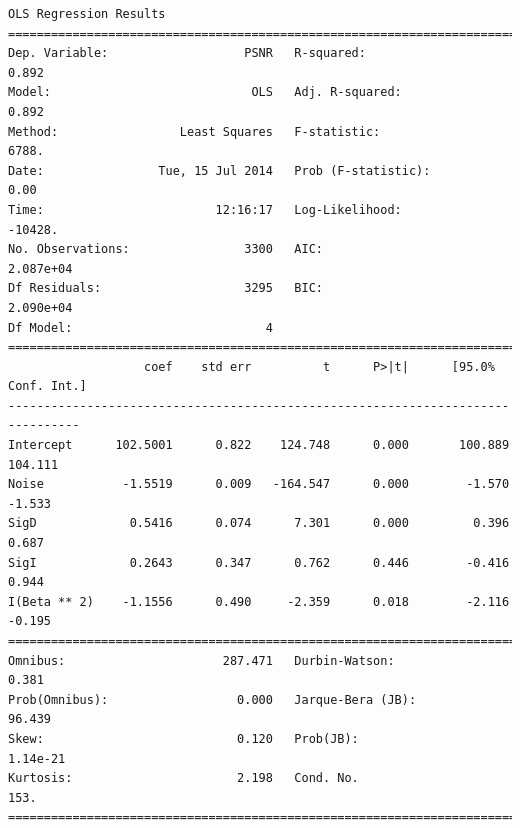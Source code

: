 \documentclass[11pt]{article}
\theoremstyle{definition}
\begin{document}
{\footnotesize
\begin{lstlisting}[caption = Time Series 1 - Bilateral Non-Local Means Filter OLS Model, label = {bilateralnlmeans1}]
                            OLS Regression Results                            
==============================================================================
Dep. Variable:                   PSNR   R-squared:                       0.892
Model:                            OLS   Adj. R-squared:                  0.892
Method:                 Least Squares   F-statistic:                     6788.
Date:                Tue, 15 Jul 2014   Prob (F-statistic):               0.00
Time:                        12:16:17   Log-Likelihood:                -10428.
No. Observations:                3300   AIC:                         2.087e+04
Df Residuals:                    3295   BIC:                         2.090e+04
Df Model:                           4                                         
================================================================================
                   coef    std err          t      P>|t|      [95.0% Conf. Int.]
--------------------------------------------------------------------------------
Intercept      102.5001      0.822    124.748      0.000       100.889   104.111
Noise           -1.5519      0.009   -164.547      0.000        -1.570    -1.533
SigD             0.5416      0.074      7.301      0.000         0.396     0.687
SigI             0.2643      0.347      0.762      0.446        -0.416     0.944
I(Beta ** 2)    -1.1556      0.490     -2.359      0.018        -2.116    -0.195
==============================================================================
Omnibus:                      287.471   Durbin-Watson:                   0.381
Prob(Omnibus):                  0.000   Jarque-Bera (JB):               96.439
Skew:                           0.120   Prob(JB):                     1.14e-21
Kurtosis:                       2.198   Cond. No.                         153.
==============================================================================
\end{lstlisting}

}
\end{document}
